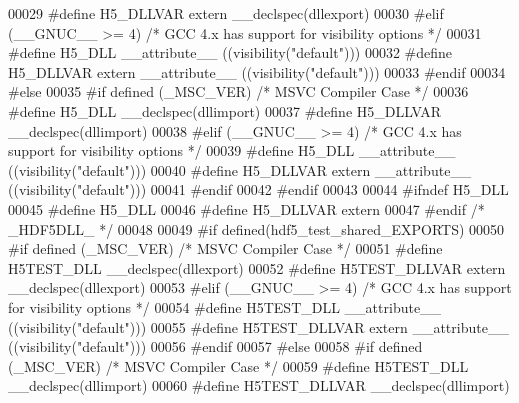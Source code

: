 \begin{DoxyCode}
00029 \textcolor{preprocessor}{    #define H5\_DLLVAR extern \_\_declspec(dllexport)}
00030 \textcolor{preprocessor}{  #elif (\_\_GNUC\_\_ >= 4)  }\textcolor{comment}{/* GCC 4.x has support for visibility options */}\textcolor{preprocessor}{}
00031 \textcolor{preprocessor}{    #define H5\_DLL \_\_attribute\_\_ ((visibility("default")))}
00032 \textcolor{preprocessor}{    #define H5\_DLLVAR extern \_\_attribute\_\_ ((visibility("default")))}
00033 \textcolor{preprocessor}{  #endif}
00034 \textcolor{preprocessor}{#else}
00035 \textcolor{preprocessor}{  #if defined (\_MSC\_VER)  }\textcolor{comment}{/* MSVC Compiler Case */}\textcolor{preprocessor}{}
00036 \textcolor{preprocessor}{    #define H5\_DLL \_\_declspec(dllimport)}
00037 \textcolor{preprocessor}{    #define H5\_DLLVAR \_\_declspec(dllimport)}
00038 \textcolor{preprocessor}{  #elif (\_\_GNUC\_\_ >= 4)  }\textcolor{comment}{/* GCC 4.x has support for visibility options */}\textcolor{preprocessor}{}
00039 \textcolor{preprocessor}{    #define H5\_DLL \_\_attribute\_\_ ((visibility("default")))}
00040 \textcolor{preprocessor}{    #define H5\_DLLVAR extern \_\_attribute\_\_ ((visibility("default")))}
00041 \textcolor{preprocessor}{  #endif}
00042 \textcolor{preprocessor}{#endif}
00043 
00044 \textcolor{preprocessor}{#ifndef H5\_DLL}
00045 \textcolor{preprocessor}{  #define H5\_DLL}
00046 \textcolor{preprocessor}{  #define H5\_DLLVAR extern}
00047 \textcolor{preprocessor}{#endif }\textcolor{comment}{/* \_HDF5DLL\_ */}\textcolor{preprocessor}{}
00048 
00049 \textcolor{preprocessor}{#if defined(hdf5\_test\_shared\_EXPORTS)}
00050 \textcolor{preprocessor}{  #if defined (\_MSC\_VER)  }\textcolor{comment}{/* MSVC Compiler Case */}\textcolor{preprocessor}{}
00051 \textcolor{preprocessor}{    #define H5TEST\_DLL \_\_declspec(dllexport)}
00052 \textcolor{preprocessor}{    #define H5TEST\_DLLVAR extern \_\_declspec(dllexport)}
00053 \textcolor{preprocessor}{  #elif (\_\_GNUC\_\_ >= 4)  }\textcolor{comment}{/* GCC 4.x has support for visibility options */}\textcolor{preprocessor}{}
00054 \textcolor{preprocessor}{    #define H5TEST\_DLL \_\_attribute\_\_ ((visibility("default")))}
00055 \textcolor{preprocessor}{    #define H5TEST\_DLLVAR extern \_\_attribute\_\_ ((visibility("default")))}
00056 \textcolor{preprocessor}{  #endif}
00057 \textcolor{preprocessor}{#else}
00058 \textcolor{preprocessor}{  #if defined (\_MSC\_VER)  }\textcolor{comment}{/* MSVC Compiler Case */}\textcolor{preprocessor}{}
00059 \textcolor{preprocessor}{    #define H5TEST\_DLL \_\_declspec(dllimport)}
00060 \textcolor{preprocessor}{    #define H5TEST\_DLLVAR \_\_declspec(dllimport)}

\end{DoxyCode}

